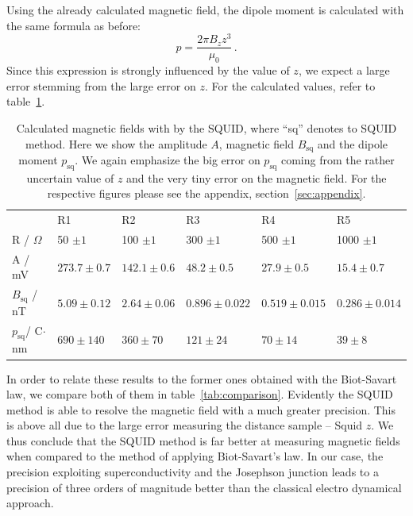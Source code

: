 Using the already calculated magnetic field, 
the dipole moment is calculated with the same formula as before:
\begin{equation}
    p  = \frac{2 \pi  B_z z^3 }{ \mu_0} \, .
\end{equation}
Since this expression is strongly influenced by the value of $z$, we expect a large error 
stemming from the large error on $z$. 
For the calculated values, refer to table~\ref{tab:squid1}. 
\begin{table}[htb]
\caption{
    Calculated magnetic fields with by the SQUID, where ``sq'' denotes to SQUID method. 
    Here we show the
    amplitude $A$, magnetic field $B_{\mathrm{sq}}$ and the dipole 
    moment $p_{\mathrm{sq}}$. We again emphasize the
    big error on $p_{\mathrm{sq}}$ coming from the rather uncertain 
    value of $z$ and the very tiny error on the magnetic field. 
    For the respective figures please see the appendix, section~\ref{sec:appendix}.}
\begin{tabular}{ l| p{2.3cm}|p{2.3cm}|p{2.3cm}|p{2.3cm}|p{2.3cm}}
    \rowcolor{tabcolor}
        & R1 & R2 & R3 & R4 & R5 \\ 
    R / $\Omega$ & 50  $\pm 1$ & 100  $\pm 1$   &
        300  $\pm 1$& 500 $\pm 1$ & 1000 $\pm 1$    \\  
    A / mV &$273.7 \pm 0.7$&$142.1 \pm 0.6$&
        $48.2 \pm 0.5$&$27.9 \pm 0.5$&$15.4 \pm 0.7$    \\
    $B_{\mathrm{sq}}$ / nT &$5.09 \pm 0.12$&$2.64 \pm 0.06$&    
        $0.896 \pm 0.022$&$0.519 \pm 0.015$&$0.286 \pm 0.014$   \\  
    $p_{\mathrm{sq}}$/ C$\cdot$nm &$690 \pm 140$ & $360 \pm 70$ &
        $121 \pm 24$ & $70 \pm 14$ & $39 \pm 8$     \\
\end{tabular}
\label{tab:squid1}
\end{table}
In order to relate these results to the former ones obtained with the Biot-Savart law, we compare 
both of them in table~\ref{tab:comparison}. 
Evidently the SQUID method is able to resolve the magnetic field with a 
much greater precision. This is above all due to the large
error measuring the distance sample -- Squid $z$. 
We thus conclude that the SQUID method is far better at measuring magnetic fields 
when compared to the method of applying Biot-Savart's law. 
In our case, the precision exploiting superconductivity 
and the Josephson junction leads to a precision of three orders of magnitude 
better than the classical electro dynamical approach. 
